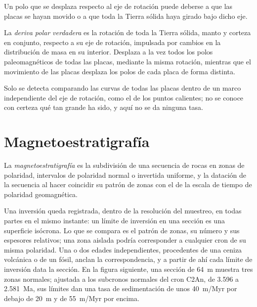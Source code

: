 Un polo que se desplaza respecto al eje de rotación puede deberse a que las placas se
hayan movido o a que toda la Tierra sólida haya girado bajo dicho eje.

\begin{definition}\label{def:b3:palaeomagnetism:tpw}
La \emph{deriva polar verdadera} es la rotación de toda la
Tierra sólida, manto y corteza en conjunto, respecto a su eje de rotación, impulsada
por cambios en la distribución de masa en su interior. Desplaza a la vez todos los
polos paleomagnéticos de todas las placas, mediante la misma rotación, mientras que el
movimiento de las placas desplaza los polos de cada placa de forma distinta.
\end{definition}

Solo se detecta comparando las curvas de todas las placas dentro de un marco
independiente del eje de rotación, como el de los puntos calientes; no se conoce
con certeza qué tan grande ha sido, y aquí no se da ninguna tasa.

\section{Magnetoestratigrafía}

\begin{definition}[Magnetoestratigrafía]\label{def:b3:palaeomagnetism:magnetostratigraphy}
La \emph{magnetoestratigrafía} es la subdivisión de una
secuencia de rocas en zonas de polaridad, intervalos de polaridad normal o invertida
uniforme, y la datación de la secuencia al hacer coincidir su patrón de zonas con
el de la escala de tiempo de polaridad geomagnética.
\end{definition}

Una inversión queda registrada, dentro de la resolución del muestreo, en todas partes
en el mismo instante: un límite de inversión en una sección es una superficie isócrona.
Lo que se compara es el patrón de zonas, su número y sus espesores relativos;
una zona aislada podría corresponder a cualquier cron de su misma polaridad. Una o dos
edades independientes, procedentes de una ceniza volcánica o de un fósil, anclan la
correspondencia, y a partir de ahí cada límite de inversión data la sección. En la figura siguiente, una sección de
\qty{64}{m} muestra tres zonas normales; ajustada a los subcronos normales del
cron C2An, de 3.596 a \qty{2.581}{Ma}, sus límites dan una tasa de sedimentación de unos
\qty{40}{m/Myr} por debajo de \qty{20}{m} y de \qty{55}{m/Myr} por encima.


